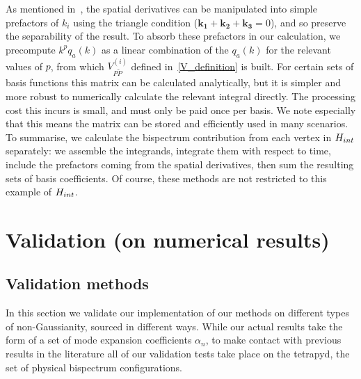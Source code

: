 As mentioned in~\cite{Funakoshi}, the spatial derivatives
can be manipulated into simple prefactors of $k_i$ using the
triangle condition ($\mathbf{k_1}+\mathbf{k_2}+\mathbf{k_3}=0$),
and so preserve the separability of the result.
To absorb these prefactors in our calculation, we precompute
$k^{p}q_a(k)$ as a linear combination of the $q_a(k)$ for the
relevant values of $p$,
from which $V^{(i)}_{P\tilde{P}}$ defined in~\eqref{V_definition} is built.
For certain sets of basis functions this matrix can be calculated analytically,
but it is simpler and more robust to numerically calculate the relevant integral directly.
The processing cost this incurs is small, and must only be
paid once per basis. We note especially that this means the matrix can
be stored and efficiently used in many scenarios.
To summarise,
we calculate the bispectrum contribution from each vertex in $H_{int}$ separately:
we assemble the integrands, integrate them with respect to time,
include the prefactors coming from the spatial derivatives,
then sum the resulting sets of basis coefficients.
Of course, these methods are not restricted to this example of $H_{int}$.

\section{Validation (on numerical results)}\label{sec:validation}
\subsection{Validation methods}\label{sec:validation_methods}
In this section we validate our implementation of our methods
on different types of non-Gaussianity, sourced in different ways.
While our actual results take the form of a set of mode expansion coefficients $\alpha_n$,
to make contact with previous results in the literature
all of our validation tests take place on the tetrapyd,
the set of physical bispectrum configurations.

